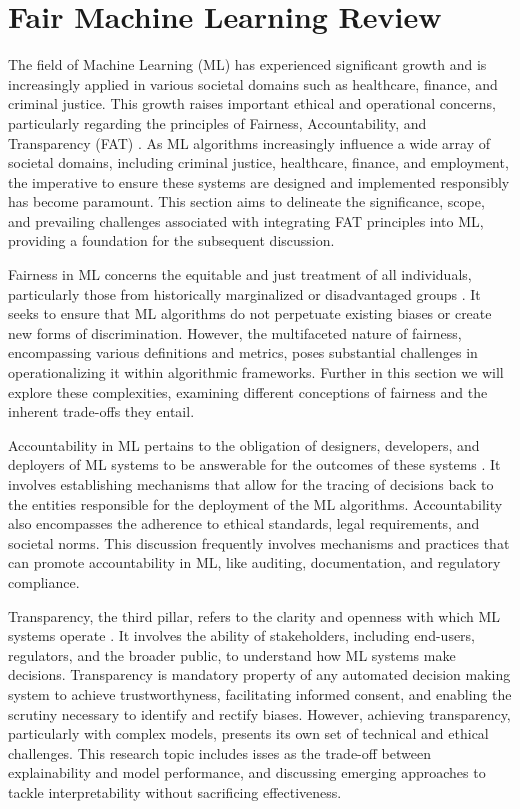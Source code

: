 
\chapter{Fair Machine Learning Review}

The field of Machine Learning (ML) has experienced significant growth and is increasingly applied in various societal domains such as healthcare, finance, and criminal justice. This growth raises important ethical and operational concerns, particularly regarding the principles of Fairness, Accountability, and Transparency (FAT) \citep{Memarian2023}. As ML algorithms increasingly influence a wide array of societal domains, including criminal justice, healthcare, finance, and employment, the imperative to ensure these systems are designed and implemented responsibly has become paramount. This section aims to delineate the significance, scope, and prevailing challenges associated with integrating FAT principles into ML, providing a foundation for the subsequent discussion.

Fairness in ML concerns the equitable and just treatment of all individuals, particularly those from historically marginalized or disadvantaged groups \citep{Mehrabi2019, caton2023}. It seeks to ensure that ML algorithms do not perpetuate existing biases or create new forms of discrimination. However, the multifaceted nature of fairness, encompassing various definitions and metrics, poses substantial challenges in operationalizing it within algorithmic frameworks. Further in this section we will explore these complexities, examining different conceptions of fairness and the inherent trade-offs they entail.

Accountability in ML pertains to the obligation of designers, developers, and deployers of ML systems to be answerable for the outcomes of these systems \citep{Hutchinson2021}. It involves establishing mechanisms that allow for the tracing of decisions back to the entities responsible for the deployment of the ML algorithms. Accountability also encompasses the adherence to ethical standards, legal requirements, and societal norms. This discussion frequently involves mechanisms and practices that can promote accountability in ML, like auditing, documentation, and regulatory compliance.

Transparency, the third pillar, refers to the clarity and openness with which ML systems operate \citep{Burkart2021}. It involves the ability of stakeholders, including end-users, regulators, and the broader public, to understand how ML systems make decisions. Transparency is mandatory property of any automated decision making system to achieve trustworthyness, facilitating informed consent, and enabling the scrutiny necessary to identify and rectify biases. However, achieving transparency, particularly with complex models, presents its own set of technical and ethical challenges. This research topic includes isses as the trade-off between explainability and model performance, and discussing emerging approaches to tackle interpretability without sacrificing effectiveness.

